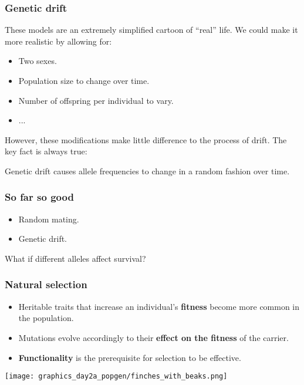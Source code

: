\documentclass{beamer}
\newcommand{\1}{\ensuremath{\mathbf{1}}}
\begin{document}
%
%
%
\begin{frame}\frametitle{Genetic drift}
	These models are an extremely simplified cartoon of ``real'' life. We could make it more realistic by allowing for:
	\begin{itemize}
		\item Two sexes.
		\item Population size to change over time.
		\item Number of offspring per individual to vary.
		\item ...
	\end{itemize}
	However, these modifications make little difference to the process of drift. The key fact is always true:
	\begin{block}{}
		Genetic drift causes allele frequencies to change in a random fashion over time.
	\end{block}
\end{frame}
%
%
%
\begin{frame}\frametitle{So far so good}
	\begin{itemize}
		\item Random mating.
		\item Genetic drift.
	\end{itemize}
	\vspace{2.5ex}What if different alleles affect survival?
\end{frame}
%
%
%
\begin{frame}\frametitle{Natural selection}
	\begin{itemize}
		\item Heritable traits that increase an individual's \textbf{fitness} become more common in the population.
		\item Mutations evolve accordingly to their \textbf{effect on the fitness} of the carrier.
		\item \textbf{Functionality} is the prerequisite for selection to be effective.
	\end{itemize}
	\phantom{pain}
	\begin{center}
		\texttt{[image: graphics\_day2a\_popgen/finches\_with\_beaks.png]}
	\end{center}
\end{frame}
\end{document}
